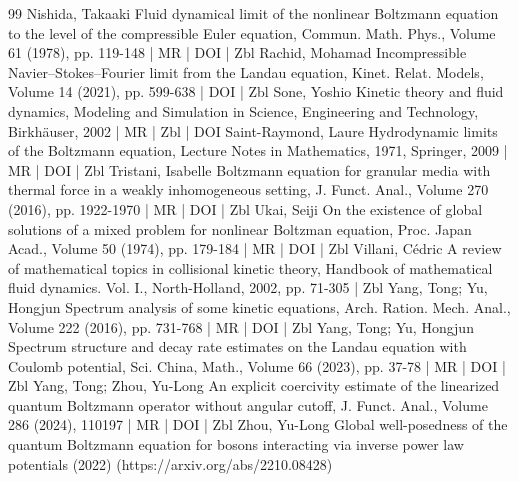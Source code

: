 \documentclass[10pt]{amsart}
\theoremstyle{definition}\newtheorem{defi}[theo]{Definition}\newtheorem{rema}[theo]{Remark}\newtheorem{exam}[theo]{Example}\newtheorem{exem}[theo]{Example}\newtheorem{nota}[theo]{Notation}
\begin{document}
\begin{thebibliography}{99}
 Nishida, Takaaki Fluid dynamical limit of the nonlinear Boltzmann equation to the level of the compressible Euler equation, Commun. Math. Phys., Volume 61 (1978), pp. 119-148 | MR | DOI | Zbl
 Rachid, Mohamad Incompressible Navier–Stokes–Fourier limit from the Landau equation, Kinet. Relat. Models, Volume 14 (2021), pp. 599-638 | DOI | Zbl
 Sone, Yoshio Kinetic theory and fluid dynamics, Modeling and Simulation in Science, Engineering and Technology, Birkhäuser, 2002 | MR | Zbl | DOI
 Saint-Raymond, Laure Hydrodynamic limits of the Boltzmann equation, Lecture Notes in Mathematics, 1971, Springer, 2009 | MR | DOI | Zbl
 Tristani, Isabelle Boltzmann equation for granular media with thermal force in a weakly inhomogeneous setting, J. Funct. Anal., Volume 270 (2016), pp. 1922-1970 | MR | DOI | Zbl
 Ukai, Seiji On the existence of global solutions of a mixed problem for nonlinear Boltzman equation, Proc. Japan Acad., Volume 50 (1974), pp. 179-184 | MR | DOI | Zbl
 Villani, Cédric A review of mathematical topics in collisional kinetic theory, Handbook of mathematical fluid dynamics. Vol. I., North-Holland, 2002, pp. 71-305 | Zbl
 Yang, Tong; Yu, Hongjun Spectrum analysis of some kinetic equations, Arch. Ration. Mech. Anal., Volume 222 (2016), pp. 731-768 | MR | DOI | Zbl
 Yang, Tong; Yu, Hongjun Spectrum structure and decay rate estimates on the Landau equation with Coulomb potential, Sci. China, Math., Volume 66 (2023), pp. 37-78 | MR | DOI | Zbl
 Yang, Tong; Zhou, Yu-Long An explicit coercivity estimate of the linearized quantum Boltzmann operator without angular cutoff, J. Funct. Anal., Volume 286 (2024), 110197 | MR | DOI | Zbl
 Zhou, Yu-Long Global well-posedness of the quantum Boltzmann equation for bosons interacting via inverse power law potentials (2022) (https://arxiv.org/abs/2210.08428)
\end{thebibliography}
\end{document}
